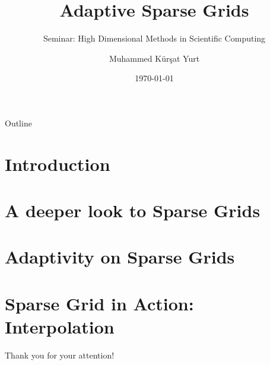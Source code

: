 \documentclass[xcolor=table,aspectratio=169]{beamer}
\title[SCCS Seminar | High Dimensional Methods | Adaptive Sparse Grids]{Adaptive Sparse Grids}
\subtitle{Seminar: High Dimensional Methods in Scientific Computing}
\author{Muhammed K\"{u}r\c{s}at Yurt}
\date{\today}
\begin{document}
\frame{\titlepage}

\begin{frame}{Outline}
    \tableofcontents
\end{frame}

\section[]{Introduction}


\section[]{A deeper look to Sparse Grids}



\section[]{Adaptivity on Sparse Grids}



\section[]{Sparse Grid in Action: Interpolation}



\begin{frame}
    \centering
    \LARGE{Thank you for your attention!}
\end{frame}
\end{document}
